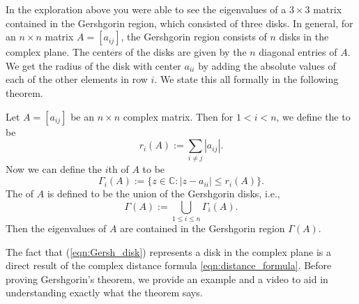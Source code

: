 \documentclass{ximera}
\begin{document}
In the exploration above you were able to see the eigenvalues of a $3 \times 3$ matrix contained in the Gershgorin region, which consisted of three disks.  In general, for an $n \times n$ matrix $A=[a_{ij}]$, the Gershgorin region consists of $n$ disks in the complex plane.  The centers of the disks are given by the $n$ diagonal entries of $A$.  We get the radius of the disk with center $a_{ii}$ by adding the absolute values of each of the other elements in row $i$.  We state this all formally in the following theorem.


\begin{theorem}[Gershgorin]\label{th:Gershgorin}
Let $A=[a_{ij}]$ be an $n\times n$ complex matrix.  Then for $1<i<n$, we define the  to be
$$
r_i(A):= \sum_{i \ne j} |a_{ij}|.
$$
Now we can define the $i$th  of $A$ to be
\begin{equation}\label{eqn:Gersh_disk}
\Gamma_i(A) := \{ z \in \mathbb{C} : |z-a_{ii}| \le r_i(A) \}.
\end{equation}
 The  of $A$ is defined to be the union of the Gershgorin disks, i.e.,
$$
\Gamma(A) := \bigcup_{1 \le i \le n} \Gamma_i(A).
$$
Then the eigenvalues of $A$ are contained in the Gershgorin region $\Gamma(A)$.
\end{theorem}

The fact that (\ref{eqn:Gersh_disk}) represents a disk in the complex plane is a direct result of the complex distance formula \ref{eqn:distance_formula}. Before proving Gershgorin's theorem, we provide an example and a video to aid in understanding exactly what the theorem says.
\youtube{}
\end{document}
